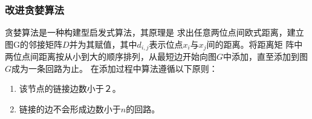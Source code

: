 \documentclass[fontset=windows,a4paper,12pt]{ctexart}
\begin{document}
      \subsubsection{改进贪婪算法\cite{饶卫振2012基于求解}}
        贪婪算法是一种构建型启发式算法，其原理是
        求出任意两位点间欧式距离，建立图G的邻接矩阵$D$并为其赋值，其中$d_{i,j}$表示位点$x_i$与$x_j$间的距离。将距离矩
        阵中两位点间距离按从小到大的顺序排列，从最短边开始向图$G$中添加，直至添加到图$G$成为一条回路为止。
        在添加过程中算法遵循以下原则：
        \begin{enumerate}
        	\item 该节点的链接边数小于２。
        	\item 链接的边不会形成边数小于$n$的回路。
        \end{enumerate}
        
\end{document}
